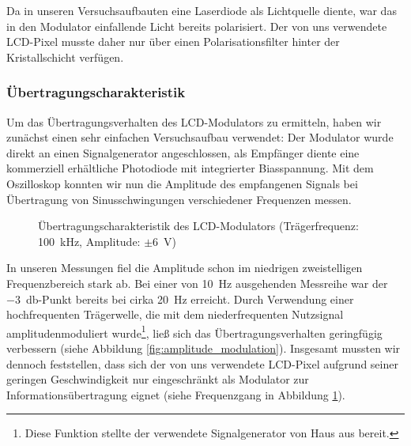 \documentclass[12pt,a4paper]{article}
\begin{document}
Da in unseren Versuchsaufbauten eine Laserdiode als Lichtquelle diente, war das in den Modulator einfallende Licht bereits polarisiert. Der von uns verwendete LCD-Pixel musste daher nur über einen Polarisationsfilter hinter der Kristallschicht verfügen.

\subsubsection{Übertragungscharakteristik}
\label{sec:lcd_transfer_characteristics}

Um das Übertragungsverhalten des LCD-Modulators zu ermitteln, haben wir zunächst einen sehr einfachen Versuchsaufbau verwendet: Der Modulator wurde direkt an einen Signalgenerator angeschlossen, als Empfänger diente eine kommerziell erhältliche Photodiode mit integrierter Biasspannung. Mit dem Oszilloskop konnten wir nun die Amplitude des empfangenen Signals bei Übertragung von Sinusschwingungen verschiedener Frequenzen messen.

\begin{figure}[H]
  \centering
  \caption{Übertragungscharakteristik des LCD-Modulators (Trägerfrequenz: \SI{100}{\kilo\hertz}, Amplitude: $\pm$\SI{6}{\volt})}
  \label{fig:lcd_transfer_function}
\end{figure}

In unseren Messungen fiel die Amplitude schon im niedrigen zweistelligen Frequenzbereich stark ab. Bei einer von \SI{10}{\hertz} ausgehenden Messreihe war der \SI{-3}{\decibel}-Punkt bereits bei cirka \SI{20}{\hertz} erreicht. Durch Verwendung einer hochfrequenten Trägerwelle, die mit dem niederfrequenten Nutzsignal amplitudenmoduliert wurde\footnote{Diese Funktion stellte der verwendete Signalgenerator von Haus aus bereit.}, ließ sich das Übertragungsverhalten geringfügig verbessern (siehe Abbildung \ref{fig:amplitude_modulation}). Insgesamt mussten wir dennoch feststellen, dass sich der von uns verwendete LCD-Pixel aufgrund seiner geringen Geschwindigkeit nur eingeschränkt als Modulator zur Informationsübertragung eignet (siehe Frequenzgang in Abbildung \ref{fig:lcd_transfer_function}).
\end{document}
